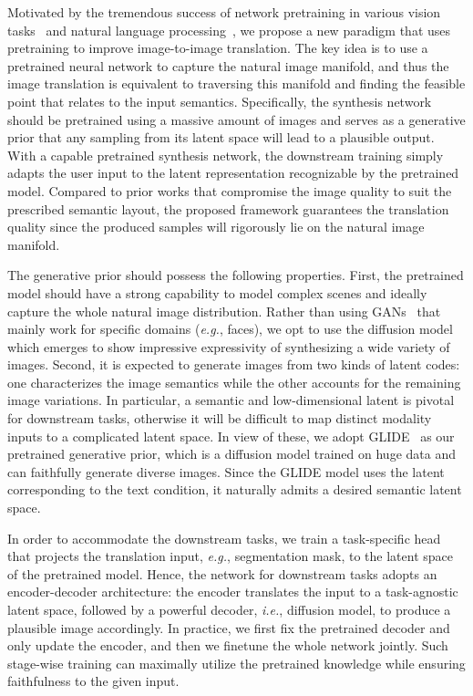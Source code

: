 Motivated by the tremendous success of network pretraining in various vision tasks~\cite{he2020momentum,chen2020simple,he2021masked,radford2021learning} and natural language processing~\cite{devlin2018bert,brown2020language}, we propose a new paradigm that uses pretraining to improve image-to-image translation. The key idea is to use a pretrained neural network to capture the natural image manifold, and thus the image translation is equivalent to traversing this manifold and finding the feasible point that relates to the input semantics. Specifically, the synthesis network should be pretrained using a massive amount of images and serves as a generative prior that any sampling from its latent space will lead to a plausible output. With a capable pretrained synthesis network, the downstream training simply adapts the user input to the latent representation recognizable by the pretrained model. Compared to prior works that compromise the image quality to suit the prescribed semantic layout, the proposed framework guarantees the translation quality since the produced samples will rigorously lie on the natural image manifold.

The generative prior should possess the following properties. First, the pretrained model should have a strong capability to model complex scenes and ideally capture the whole natural image distribution. Rather than using GANs~\cite{goodfellow2014generative,brock2018large,karras2019style,zhang2021styleswin} that mainly work for specific domains (\textit{e.g.}\@, faces), we opt to use the diffusion model~\cite{ho2020denoising,song2020improved,dhariwal2021diffusion} which emerges to show impressive expressivity of synthesizing a wide variety of images. Second, it is expected to generate images from two kinds of latent codes: one characterizes the image semantics while the other accounts for the remaining image variations. In particular, a semantic and low-dimensional latent is pivotal for downstream tasks, otherwise it will be difficult to map distinct modality inputs to a complicated latent space. In view of these, we adopt GLIDE~\cite{nichol2021glide} as our pretrained generative prior, which is a diffusion model trained on huge data and can faithfully generate diverse images. Since the GLIDE model uses the latent corresponding to the text condition, it naturally admits a desired semantic latent space.

In order to accommodate the downstream tasks, we train a task-specific head that projects the translation input, \textit{e.g.}\@, segmentation mask, to the latent space of the pretrained model. Hence, the network for downstream tasks adopts an encoder-decoder architecture: the encoder translates the input to a task-agnostic latent space, followed by a powerful decoder, \textit{i.e.}\@, diffusion model, to produce a plausible image accordingly. In practice, we first fix the pretrained decoder and only update the encoder, and then we finetune the whole network jointly. Such stage-wise training can maximally utilize the pretrained knowledge while ensuring faithfulness to the given input.

